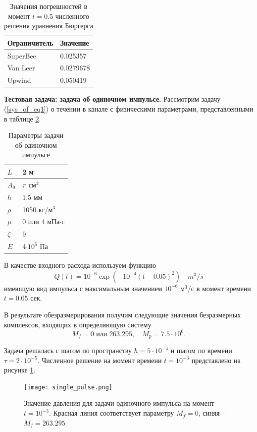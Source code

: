 \begin{table}[h]
\centering
\caption {Значения погрешностей в момент $t=0.5$ численного решения уравнения Бюргерса}
\label{tab:norms_burgers}
\begin{tabular}{|l|l|}
\hline
Ограничитель & Значение \\
\hline
SuperBee & 0.025357\\
\hline
Van Leer & 0.0279678\\
\hline
Upwind  & 0.050419\\
\hline
\end{tabular}
\end{table}

\clearpage
{\bf Тестовая задача: задача об одиночном импульсе.}
Рассмотрим задачу (\ref{sys_of_eq1}) о течении в канале с физическими параметрами, представленными в 
таблице \ref{tab:single_impulse_params}.

\begin{table}[h]
\centering
\caption {Параметры задачи об одиночном импульсе}
\label{tab:single_impulse_params}
\begin{tabular}{|l|l|}
\hline
$L$ & 2 м \\
\hline
$A_0$ & $\pi$ см$^2$\\
\hline
$h$ & $1.5$ мм\\
\hline
$\rho$  & 1050 кг/м$^3$\\
\hline
$\mu$  & 0 или 4 мПа$\cdot$с\\
\hline
$\zeta$  & 9\\
\hline
$E$  & 4$\cdot10^5$ Па\\
\hline
\end{tabular}
\end{table}

В качестве входного расхода используем функцию
$$
Q(t) = 10^{-6} \exp\left(-10^{-4}(t-0.05)^2\right) \quad m^3/s
$$
имеющую вид импульса с максимальным значением $10^{-6}$ м$^3$/с в момент времени $t=0.05$ сек.

В результате обезразмерирования получим следующие значения безразмерных комплексов, входящих в определяющую систему
$$
M_f = 0 \text{ или } 263.295,\quad  M_p = 7.5\cdot10^{6}.
$$

Задача решалась с шагом по пространству $h=5\cdot10^{-4}$ и шагом по времени $\tau=2 \cdot 10^{-5}$.
Численное решение на момент времени $t=10^{-3}$ представлено на рисунке \ref{fig:single_pulse_result}.

\begin{figure}[h]
\centering
\texttt{[image: single\_pulse.png]}
\caption{Значение давления для задачи одиночного импульса на момент $t=10^{-3}$. Красная линия соответствует параметру $M_f=0$, синяя -- $M_f=263.295$}
\label{fig:single_pulse_result}
\end{figure}
